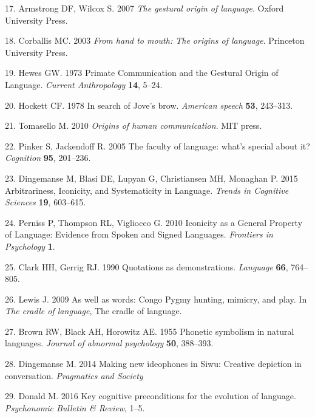 \documentclass[english,floatsintext,man]{apa6}
\theoremstyle{definition}
\theoremstyle{definition}
\theoremstyle{definition}
\theoremstyle{remark}
\begin{document}
\leavevmode\hypertarget{ref-Armstrong:2007go}{}%
17. Armstrong DF, Wilcox S. 2007 \emph{The gestural origin of language}.
Oxford University Press.

\leavevmode\hypertarget{ref-Corballis:2003ha}{}%
18. Corballis MC. 2003 \emph{From hand to mouth: The origins of
language}. Princeton University Press.

\leavevmode\hypertarget{ref-Hewes:1973vr}{}%
19. Hewes GW. 1973 Primate Communication and the Gestural Origin of
Language. \emph{Current Anthropology} \textbf{14}, 5--24.

\leavevmode\hypertarget{ref-Hockett:1978se}{}%
20. Hockett CF. 1978 In search of Jove's brow. \emph{American speech}
\textbf{53}, 243--313.

\leavevmode\hypertarget{ref-Tomasello:2010or}{}%
21. Tomasello M. 2010 \emph{Origins of human communication}. MIT press.

\leavevmode\hypertarget{ref-Pinker:2005cv}{}%
22. Pinker S, Jackendoff R. 2005 The faculty of language: what's special
about it? \emph{Cognition} \textbf{95}, 201--236.

\leavevmode\hypertarget{ref-Dingemanse:2015cu}{}%
23. Dingemanse M, Blasi DE, Lupyan G, Christiansen MH, Monaghan P. 2015
Arbitrariness, Iconicity, and Systematicity in Language. \emph{Trends in
Cognitive Sciences} \textbf{19}, 603--615.

\leavevmode\hypertarget{ref-Perniss:2010fb}{}%
24. Perniss P, Thompson RL, Vigliocco G. 2010 Iconicity as a General
Property of Language: Evidence from Spoken and Signed Languages.
\emph{Frontiers in Psychology} \textbf{1}.

\leavevmode\hypertarget{ref-Clark:1990cl}{}%
25. Clark HH, Gerrig RJ. 1990 Quotations as demonstrations.
\emph{Language} \textbf{66}, 764--805.

\leavevmode\hypertarget{ref-Lewis:2009wz}{}%
26. Lewis J. 2009 As well as words: Congo Pygmy hunting, mimicry, and
play. In \emph{The cradle of language}, The cradle of language.

\leavevmode\hypertarget{ref-Brown:1955wy}{}%
27. Brown RW, Black AH, Horowitz AE. 1955 Phonetic symbolism in natural
languages. \emph{Journal of abnormal psychology} \textbf{50}, 388--393.

\leavevmode\hypertarget{ref-Dingemanse:2014gj}{}%
28. Dingemanse M. 2014 Making new ideophones in Siwu: Creative depiction
in conversation. \emph{Pragmatics and Society}

\leavevmode\hypertarget{ref-Donald:2016kd}{}%
29. Donald M. 2016 Key cognitive preconditions for the evolution of
language. \emph{Psychonomic Bulletin \& Review}, 1--5.
\end{document}
